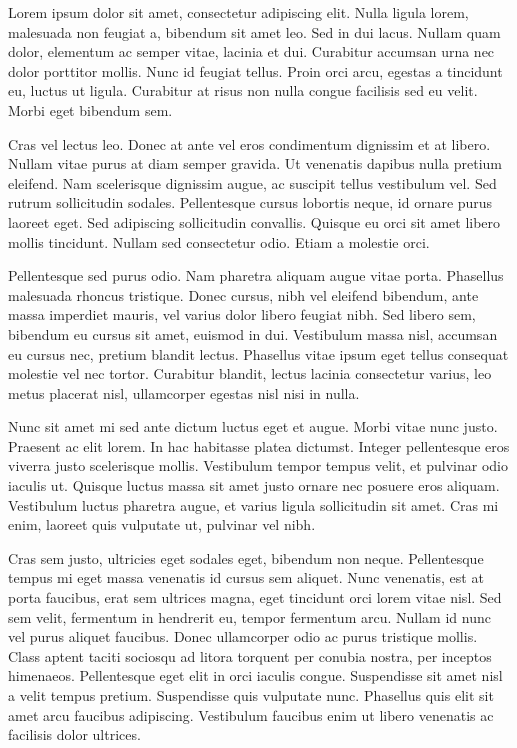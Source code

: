 Lorem ipsum dolor sit amet, consectetur adipiscing elit. Nulla ligula lorem, malesuada non feugiat a, bibendum sit amet leo. Sed in dui lacus. Nullam quam dolor, elementum ac semper vitae, lacinia et dui. Curabitur accumsan urna nec dolor porttitor mollis. Nunc id feugiat tellus. Proin orci arcu, egestas a tincidunt eu, luctus ut ligula. Curabitur at risus non nulla congue facilisis sed eu velit. Morbi eget bibendum sem.

Cras vel lectus leo. Donec at ante vel eros condimentum dignissim et at libero. Nullam vitae purus at diam semper gravida. Ut venenatis dapibus nulla pretium eleifend. Nam scelerisque dignissim augue, ac suscipit tellus vestibulum vel. Sed rutrum sollicitudin sodales. Pellentesque cursus lobortis neque, id ornare purus laoreet eget. Sed adipiscing sollicitudin convallis. Quisque eu orci sit amet libero mollis tincidunt. Nullam sed consectetur odio. Etiam a molestie orci.

Pellentesque sed purus odio. Nam pharetra aliquam augue vitae porta. Phasellus malesuada rhoncus tristique. Donec cursus, nibh vel eleifend bibendum, ante massa imperdiet mauris, vel varius dolor libero feugiat nibh. Sed libero sem, bibendum eu cursus sit amet, euismod in dui. Vestibulum massa nisl, accumsan eu cursus nec, pretium blandit lectus. Phasellus vitae ipsum eget tellus consequat molestie vel nec tortor. Curabitur blandit, lectus lacinia consectetur varius, leo metus placerat nisl, ullamcorper egestas nisl nisi in nulla.

Nunc sit amet mi sed ante dictum luctus eget et augue. Morbi vitae nunc justo. Praesent ac elit lorem. In hac habitasse platea dictumst. Integer pellentesque eros viverra justo scelerisque mollis. Vestibulum tempor tempus velit, et pulvinar odio iaculis ut. Quisque luctus massa sit amet justo ornare nec posuere eros aliquam. Vestibulum luctus pharetra augue, et varius ligula sollicitudin sit amet. Cras mi enim, laoreet quis vulputate ut, pulvinar vel nibh.

Cras sem justo, ultricies eget sodales eget, bibendum non neque. Pellentesque tempus mi eget massa venenatis id cursus sem aliquet. Nunc venenatis, est at porta faucibus, erat sem ultrices magna, eget tincidunt orci lorem vitae nisl. Sed sem velit, fermentum in hendrerit eu, tempor fermentum arcu. Nullam id nunc vel purus aliquet faucibus. Donec ullamcorper odio ac purus tristique mollis. Class aptent taciti sociosqu ad litora torquent per conubia nostra, per inceptos himenaeos. Pellentesque eget elit in orci iaculis congue. Suspendisse sit amet nisl a velit tempus pretium. Suspendisse quis vulputate nunc. Phasellus quis elit sit amet arcu faucibus adipiscing. Vestibulum faucibus enim ut libero venenatis ac facilisis dolor ultrices.